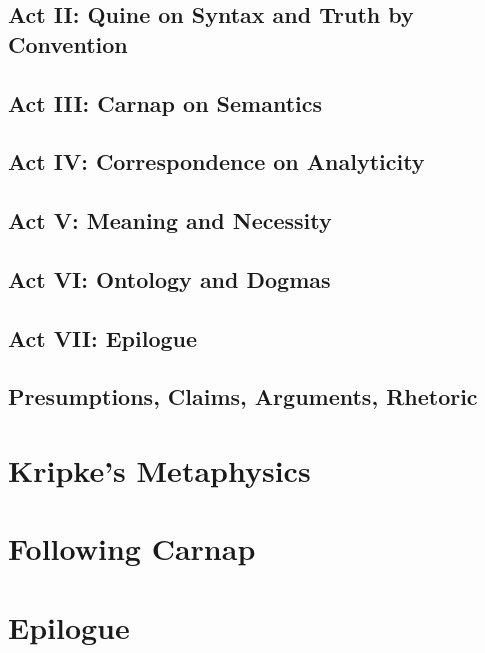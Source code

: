 \section{Act II: Quine on Syntax and Truth by Convention}

\section{Act III: Carnap on Semantics}

\section{Act IV: Correspondence on Analyticity}

\section{Act V: Meaning and Necessity}

\section{Act VI: Ontology and Dogmas}

\section{Act VII: Epilogue}

\section{Presumptions, Claims, Arguments, Rhetoric}

\chapter{Kripke's Metaphysics}

\chapter{Following Carnap}

\chapter{Epilogue}

\backmatter




\clearpage

\clearpage

\twocolumn[
]
{\small\printindex}

\vfil


